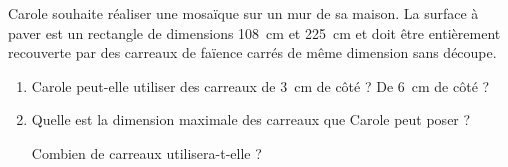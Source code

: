 \documentclass[main.tex]{subfiles}
\begin{document}
\medskip
\begin{exercise}\hfill %
	
	\noindent Carole souhaite réaliser une mosaïque sur un mur de sa maison. La surface à paver est un
	rectangle de dimensions \SI{108}{\centi\meter}  et  \SI{225}{\centi\meter}  et doit être entièrement recouverte par des carreaux de faïence carrés de même dimension sans découpe. 
	\begin{enumerate}[label={\alph*)},    leftmargin=*] 
		\item Carole peut-elle utiliser des carreaux de \SI{3}{\centi\meter}  de côté ? De \SI{6}{\centi\meter}  de côté ?
		\item Quelle est la dimension maximale des carreaux que Carole peut poser ?
		
		Combien de carreaux utilisera-t-elle ?
	\end{enumerate}
\end{exercise}
\end{document}
